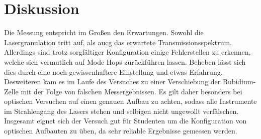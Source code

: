\section{Diskussion}
\label{sec:Diskussion}
Die Messung entspricht im Großen den Erwartungen.
Sowohl die Lasergranulation tritt auf,
als aucg das erwartete Transmissionsspektrum.
Allerdings sind trotz sorgfältiger Konfiguration einige Fehlerstellen zu erkennen,
welche sich vermutlich auf Mode Hops zurückführen lassen.
Beheben lässt sich dies durch eine noch gewissenhaftere Einstellung und etwas Erfahrung.
Desweiteren kam es im Laufe des Versuches zu einer Verschiebung der Rubidium-Zelle
mit der Folge von falschen Messergebnissen.
Es gilt daher besonders bei optischen Versuchen auf einen genauen Aufbau zu achten,
sodass alle Instrumente im Strahlengang des Lasers stehen und selbigen nicht ungewollt verfälschen.
Insgesamt eignet sich der Versuch gut für Studenten um die Konfiguration von optischen Aufbauten zu üben,
da sehr reliable Ergebnisse gemessen werden.